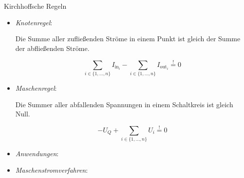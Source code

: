 \begin{defi}{Kirchhoffsche Regeln}
    \begin{itemize}
        \item \emph{Knotenregel}:

              Die Summe aller zufließenden Ströme in einem Punkt ist gleich der Summe der abfließenden Ströme.

              \[
                  \sum_{i \in \{1, \ldots, n\}} I_{\text{in}_i} - \sum_{i \in \{1, \ldots, n\}} I_{\text{out}_i} \stackrel{!}{=} 0
              \]
        \item \emph{Maschenregel}:

              Die Summer aller abfallenden Spannungen in einem Schaltkreis ist gleich Null.

              \[
                  - U_Q + \sum_{i \in \{1, \ldots, n\}} U_i \stackrel{!}{=} 0
              \]
        \item \emph{Anwendungen}:
        \item \emph{Maschenstromverfahren}:
    \end{itemize}
\end{defi}